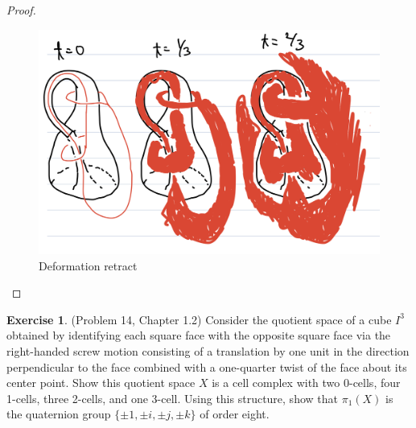 \documentclass[12pt, psamsfonts]{amsart}
\theoremstyle{definition}
\newtheorem*{exer}{Exercise}
\theoremstyle{remark}
\numberwithin{equation}{section}
\begin{document}
\begin{proof}
  \begin{figure}
    \includegraphics[width=.5\linewidth]{klein_complement.jpeg}
    \caption{Deformation retract}
    \label{fig:klein_complmenent}
  \end{figure}
\end{proof}

\begin{exer}{(Problem 14, Chapter 1.2)}
  Consider the quotient space of a cube $I^3$ obtained by identifying each square face with the opposite square face via the right-handed screw motion consisting of a translation by one unit in the direction perpendicular to the face combined with a one-quarter twist of the face about its center point.
  Show this quotient space $X$ is a cell complex with two 0-cells, four 1-cells, three 2-cells, and one 3-cell.
  Using this structure, show that $\pi_1(X)$ is the quaternion group $\{ \pm 1, \pm i, \pm j, \pm k \}$ of order eight.
\end{exer}
\end{document}
